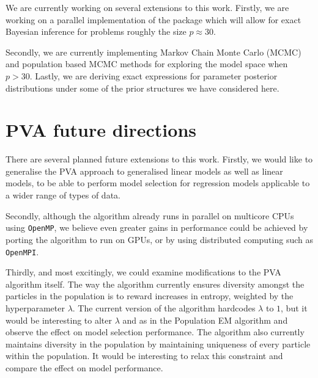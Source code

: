 We are currently working on several extensions to this work. Firstly, we are working on a parallel
implementation of the package which will allow for exact Bayesian inference for problems roughly the size
$p\approx 30$.

Secondly, we are currently implementing  Markov Chain Monte Carlo (MCMC) and population based MCMC methods for
exploring the model space when $p>30$. Lastly, we are deriving exact expressions for parameter posterior
distributions under some of the prior structures we have considered here.

\section{PVA future directions}

There are several planned future extensions to this work. Firstly, we would like to generalise the PVA
approach to generalised linear models as well as linear models, to be able to perform model selection for
regression models applicable to a wider range of types of data.

Secondly, although the algorithm already runs in parallel on multicore CPUs using \texttt{OpenMP}, we believe
even greater gains in performance could be achieved by porting the algorithm to run on GPUs, or by using
distributed computing such as \texttt{OpenMPI}.

Thirdly, and most excitingly, we could examine modifications to the PVA algorithm itself. The way the algorithm
currently ensures diversity amongst the particles in the population is to reward increases in entropy,
weighted by the hyperparameter $\lambda$. The current version of the algorithm hardcodes $\lambda$ to $1$, but
it would be interesting to alter $\lambda$ and as in the Population EM algorithm \cite{Tan2018} and observe the
effect on model selection performance. The algorithm also currently maintains diversity in the population by
maintaining uniqueness of every particle within the population. It would be interesting to relax this
constraint and compare the effect on model performance.
